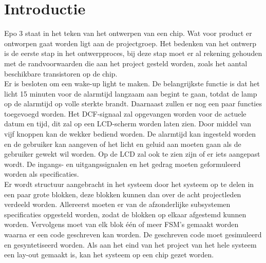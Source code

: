 \chapter{Introductie}
Epo 3 staat in het teken van het ontwerpen van een chip. Wat voor product er ontworpen gaat worden ligt aan de projectgroep. Het bedenken van het ontwerp is de eerste stap in het ontwerpproces, bij deze stap moet er al rekening gehouden met de randvoorwaarden die aan het project gesteld worden, zoals het aantal beschikbare transistoren op de chip.\\
Er is besloten om een wake-up light te maken. De belangrijkste functie is dat het licht 15 minuten voor de alarmtijd langzaam aan begint te gaan, totdat de lamp op de alarmtijd op volle sterkte brandt. Daarnaast zullen er nog een paar functies toegevoegd worden. Het DCF-signaal zal opgevangen worden voor de actuele datum en tijd, dit zal op een LCD-scherm worden laten zien. Door middel van vijf knoppen kan de wekker bediend worden. De alarmtijd kan ingesteld worden en de gebruiker kan aangeven of het licht en geluid aan moeten gaan als de gebruiker gewekt wil worden. Op de LCD zal ook te zien zijn of er iets aangepast wordt. De ingangs- en uitgangssignalen en het gedrag moeten geformuleerd worden als specificaties.\\
Er wordt structuur aangebracht in het systeem door het systeem op te delen in een paar grote blokken, deze blokken kunnen dan over de acht projectleden verdeeld worden. Allereerst moeten er van de afzonderlijke subsystemen specificaties opgesteld worden, zodat de blokken op elkaar afgestemd kunnen worden. Vervolgens moet van elk blok \'e\'en of meer FSM's gemaakt worden waarna er een code geschreven kan worden. De geschreven code moet gesimuleerd en gesyntetiseerd worden. Als aan het eind van het project van het hele systeem een lay-out gemaakt is, kan het systeem op een chip gezet worden.
